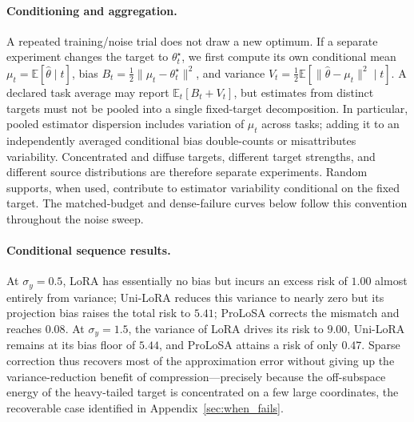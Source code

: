 \paragraph{Conditioning and aggregation.}
A repeated training/noise trial does not draw a new optimum. If a separate experiment changes the target to $\theta_t^\star$, we first compute its own conditional mean $\mu_t=\mathbb E[\hat\theta\mid t]$, bias $B_t=\tfrac12\|\mu_t-\theta_t^\star\|^2$, and variance $V_t=\tfrac12\mathbb E[\|\hat\theta-\mu_t\|^2\mid t]$. A declared task average may report $\mathbb E_t[B_t+V_t]$, but estimates from distinct targets must not be pooled into a single fixed-target decomposition. In particular, pooled estimator dispersion includes variation of $\mu_t$ across tasks; adding it to an independently averaged conditional bias double-counts or misattributes variability. Concentrated and diffuse targets, different target strengths, and different source distributions are therefore separate experiments. Random supports, when used, contribute to estimator variability conditional on the fixed target. The matched-budget and dense-failure curves below follow this convention throughout the noise sweep.

\paragraph{Conditional sequence results.}
At \(\sigma_y=0.5\), LoRA has essentially no bias but incurs an excess risk of \(1.00\) almost entirely from variance; Uni-LoRA reduces this variance to nearly zero but its projection bias raises the total risk to \(5.41\); ProLoSA corrects the mismatch and reaches \(0.08\). 
At \(\sigma_y=1.5\), the variance of LoRA drives its risk to \(9.00\), Uni-LoRA remains at its bias floor of \(5.44\), and ProLoSA attains a risk of only \(0.47\).
Sparse correction thus recovers most of the approximation error without giving up the variance-reduction benefit of compression---precisely because the off-subspace energy of the heavy-tailed target is concentrated on a few large coordinates, the recoverable case identified in Appendix~\ref{sec:when_fails}.

